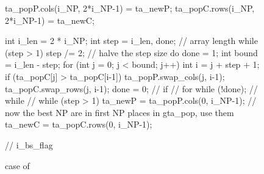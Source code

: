 \documentclass[nojss,shortnames,article]{jss}
\begin{document}
\begin{sidewaysfigure}
\begin{minipage}{0.56\linewidth}
\begin{CodeChunk}
\begin{CodeInput}
{	    ta_popP.cols(i_NP, 2*i_NP-1) = ta_newP;
	    ta_popC.rows(i_NP, 2*i_NP-1) = ta_newC;

	    int i_len = 2 * i_NP;
	    int step = i_len, done;	// array length 
	    while (step > 1) {
		step /= 2;   		// halve the step size 
		do {
		    done = 1;
		    int bound  = i_len - step;
		    for (int j = 0; j < bound; j++) {
			int i = j + step + 1;
			if (ta_popC[j] > ta_popC[i-1]) {
			    ta_popP.swap_cols(j, i-1);
			    ta_popC.swap_rows(j, i-1);
			    done = 0;
			}  // if 
		    }  // for 
		} while (!done); // while
	    } // while (step > 1) 
	    ta_newP = ta_popP.cols(0, i_NP-1);	// now the best NP are in first NP places in gta_pop, use them
	    ta_newC = ta_popC.rows(0, i_NP-1);
	} // i_bs_flag
      \end{CodeInput}
    \end{CodeChunk}
    
    \normalsize {}
  \end{minipage}
  \caption{ case of }
  \label{fig:deoptim_end}
\end{sidewaysfigure}
\end{document}
